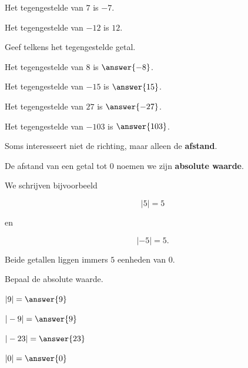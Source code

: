 \documentclass{ximera}
\begin{document}
Het tegengestelde van \(7\) is \(-7\).

Het tegengestelde van \(-12\) is \(12\).

\begin{oefening}{\oefB}

Geef telkens het tegengestelde getal.

\begin{question} Het tegengestelde van \(8\) is \(\answer{-8}\). \end{question}

\begin{question} Het tegengestelde van \(-15\) is \(\answer{15}\). \end{question}

\begin{question} Het tegengestelde van \(27\) is \(\answer{-27}\). \end{question}

\begin{question} Het tegengestelde van \(-103\) is \(\answer{103}\). \end{question}

\end{oefening}




Soms interesseert niet de richting, maar alleen de \textbf{afstand}.

De afstand van een getal tot \(0\) noemen we zijn
\textbf{absolute waarde}.

We schrijven bijvoorbeeld

\[
|5|=5
\]

en

\[
|-5|=5.
\]

Beide getallen liggen immers \(5\) eenheden van \(0\).

\begin{oefening}{\oefB}

Bepaal de absolute waarde.

\begin{question} \(|9|=\answer{9}\) \end{question}

\begin{question} \(|-9|=\answer{9}\) \end{question}

\begin{question} \(|-23|=\answer{23}\) \end{question}

\begin{question} \(|0|=\answer{0}\) \end{question}

\end{oefening}
\end{document}
